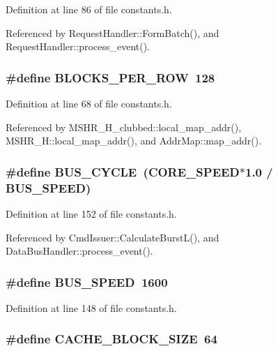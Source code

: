 Definition at line 86 of file constants.h.

Referenced by RequestHandler::FormBatch(), and RequestHandler::process\_\-event().
\subsubsection[{BLOCKS\_\-PER\_\-ROW}]{\setlength{\rightskip}{0pt plus 5cm}\#define BLOCKS\_\-PER\_\-ROW~128}\label{constants_8h_049e7586f4dee8bf82b0db100e1c36d4}




Definition at line 68 of file constants.h.

Referenced by MSHR\_\-H\_\-clubbed::local\_\-map\_\-addr(), MSHR\_\-H::local\_\-map\_\-addr(), and AddrMap::map\_\-addr().
\subsubsection[{BUS\_\-CYCLE}]{\setlength{\rightskip}{0pt plus 5cm}\#define BUS\_\-CYCLE~(CORE\_\-SPEED$\ast$1.0 / BUS\_\-SPEED)}\label{constants_8h_b2d4e03c1adc636fe758a2eee8831db4}




Definition at line 152 of file constants.h.

Referenced by CmdIssuer::CalculateBurstL(), and DataBusHandler::process\_\-event().
\subsubsection[{BUS\_\-SPEED}]{\setlength{\rightskip}{0pt plus 5cm}\#define BUS\_\-SPEED~1600}\label{constants_8h_0703c48aced43db01cfd05859ec6b1d0}




Definition at line 148 of file constants.h.
\subsubsection[{CACHE\_\-BLOCK\_\-SIZE}]{\setlength{\rightskip}{0pt plus 5cm}\#define CACHE\_\-BLOCK\_\-SIZE~64}\label{constants_8h_9e92828e1e7a7cc03003c00282384f96}




